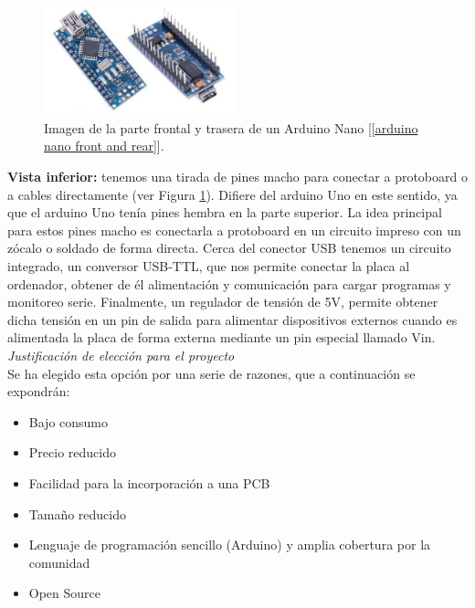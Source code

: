 \documentclass[12pt]{article}
\begin{document}
	\begin{figure}[h!]
		\begin{center}
			\includegraphics[width=0.5\textwidth]{img/front_rear_arduino.jpg}
			\caption{Imagen de la parte frontal y trasera de un Arduino Nano [\ref{arduino nano front and rear}].}
			\label{arduino rear and front}
		\end{center}
	\end{figure}
	
	\noindent \textbf{Vista inferior:} tenemos una tirada de pines macho para conectar a protoboard o a cables directamente (ver Figura \ref{arduino rear and front}). Difiere del arduino Uno en este sentido, ya que el arduino Uno tenía pines hembra en la parte superior. La idea principal para estos pines macho es conectarla a protoboard en un circuito impreso con un zócalo o soldado de forma directa.
	Cerca del conector USB tenemos un circuito integrado, un conversor USB-TTL, que nos permite conectar la placa al ordenador, obtener de él alimentación y comunicación para cargar programas y monitoreo serie. Finalmente, un regulador de tensión de 5V, permite obtener dicha tensión en un pin de salida para alimentar dispositivos externos cuando es alimentada la placa de forma externa mediante un pin especial llamado Vin.  \\

	\noindent \textit{Justificación de elección para el proyecto} \\
	
	\noindent Se ha elegido esta opción por una serie de razones, que a continuación se expondrán: 
	
	\begin{itemize}
		\item Bajo consumo
		\item Precio reducido
		\item Facilidad para la incorporación a una PCB
		\item Tamaño reducido
		\item Lenguaje de programación sencillo (Arduino) y amplia cobertura por la comunidad
		\item Open Source
	\end{itemize}
	
\end{document}
